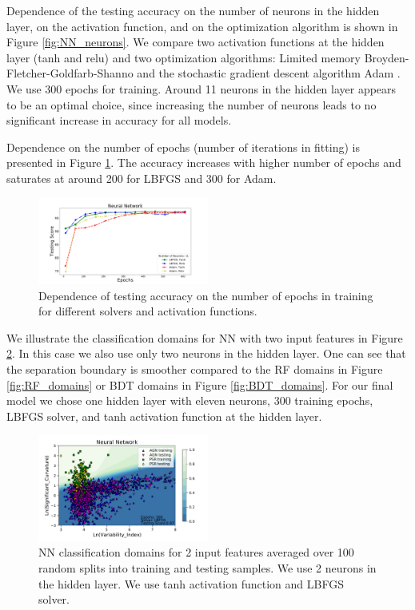 Dependence of the testing accuracy on the number of neurons in the hidden layer, on the activation function, 
and on the optimization algorithm is shown in Figure \ref{fig:NN_neurons}. 
We compare two activation functions at the hidden layer (tanh and relu) and two optimization algorithms: 
Limited memory Broyden-Fletcher-Goldfarb-Shanno \citep[LBFGS,][]{lbfgs} 
and the stochastic gradient descent algorithm Adam \citep{2014arXiv1412.6980K}.
We use 300 epochs for training.
Around 11 neurons in the hidden layer appears to be an optimal choice, since increasing the number of neurons leads to no significant increase in accuracy for all models. 

Dependence on the number of epochs (number of iterations in fitting) is presented in Figure \ref{fig:NN_epochs}. 
The accuracy increases with higher number of epochs and saturates at around 200 for LBFGS and 300 for Adam. 




\begin{figure}[h]
\hspace*{-0.5cm}
\includegraphics[width=0.5\textwidth]{plots/nn_train_epochs_assocnewfeat.pdf}
\caption{
Dependence of testing accuracy on the number of epochs in training for different solvers and activation functions.
}
\label{fig:NN_epochs}
\end{figure}
 
We illustrate the classification domains for NN with two input features in Figure \ref{fig:NN_domains}. 
In this case we also use only two neurons in the hidden layer.
One can see that the separation boundary is smoother compared to the RF domains in Figure \ref{fig:RF_domains} or BDT domains in Figure \ref{fig:BDT_domains}.
For our final model we chose one hidden layer with eleven neurons, 300 training epochs, LBFGS solver, and tanh activation function at the hidden layer.


\begin{figure}[h]
\center
\includegraphics[width=0.5\textwidth]{plots/classification_domains/nn_300_lbfgs.pdf}
\caption{NN classification domains for 2 input features
averaged over 100 random splits into training and testing samples.
We use 2 neurons in the hidden layer. 
We use tanh activation function and LBFGS solver. 
}
\label{fig:NN_domains}
\end{figure}

